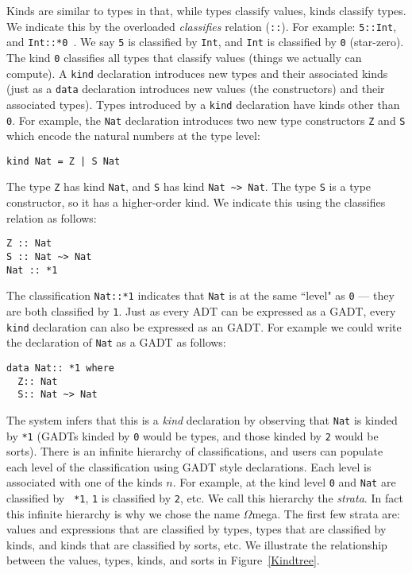 \documentclass[11pt,twoside]{article}
\newcommand{\om}{$\Omega$mega}
\begin{document}
Kinds are similar to types in that, while types classify values, kinds classify
types. We indicate this by the overloaded {\em classifies} relation ({\tt ::}). For example:
{\tt 5::Int}, and {\tt Int::*0 }. We say {\tt 5} is classified by {\tt Int}, and {\tt Int}
is classified by {\tt *0} (star-zero). The kind {\tt *0} classifies all
types that classify values (things we actually can compute). A {\tt kind}
declaration introduces new types and their associated kinds (just as a {\tt data}
declaration introduces new values (the constructors) and their associated types).
Types introduced by a {\tt kind} declaration have kinds other than {\tt *0}.
For example, the {\tt Nat} declaration introduces two new
type constructors {\tt Z} and {\tt S} which encode the natural
numbers at the type level:  
\begin{verbatim}
kind Nat = Z | S Nat
\end{verbatim}
The type {\tt Z} has kind {\tt Nat}, and {\tt S} has kind {\tt Nat \verb+~+>
Nat}. The type {\tt S} is a type constructor, so it has a higher-order kind. We
indicate this using the classifies relation as follows:
\begin{verbatim}
Z :: Nat
S :: Nat ~> Nat
Nat :: *1
\end{verbatim}

The classification {\tt Nat::*1} indicates that {\tt Nat} is at the same
``level" as {\tt *0} --- they are both classified by {\tt *1}.
Just as every ADT can be expressed as a GADT, every {\tt kind}
declaration can also be expressed as an GADT. For example we could write
the declaration of {\tt Nat} as a GADT as follows:
\begin{verbatim}
data Nat:: *1 where
  Z:: Nat
  S:: Nat ~> Nat
\end{verbatim}

The system infers that this is a {\em kind} declaration by observing
that {\tt Nat} is kinded by \verb+*1+ (GADTs kinded by {\tt *0} would
be types, and those kinded by {\tt *2} would be sorts). 
There is
an infinite hierarchy of classifications, and users
can populate each level of the classification using GADT style
declarations. Each level is associated with one of the kinds
{\tt *}$n$. For example, at the kind level {\tt *0} and {\tt Nat} are classified by {\tt
*1}, {\tt *1} is classified by {\tt *2}, etc.  We call this hierarchy
the {\em strata}. In fact this infinite hierarchy is why we chose the
name \om. The first few strata are: values and expressions that are
classified by types, types that are classified by kinds, and kinds that
are classified by sorts, etc. We illustrate
the relationship between the values, types, kinds, and sorts in
Figure~\ref{Kindtree}.
\end{document}
